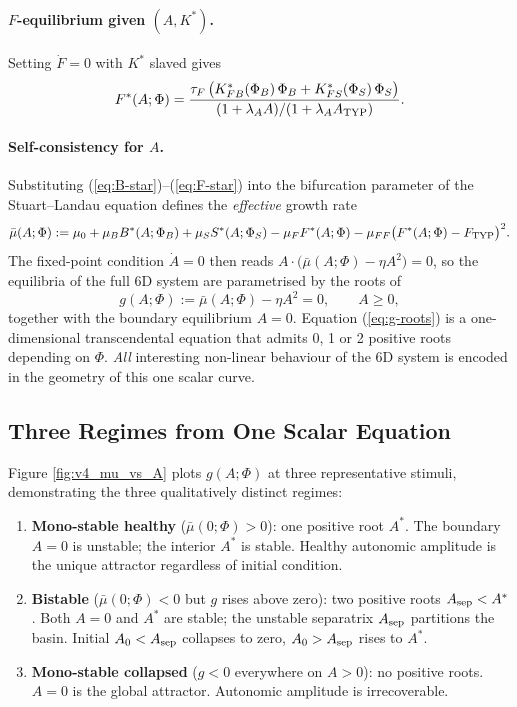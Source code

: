 \paragraph{$F$-equilibrium given $(A, K^*)$.}
Setting $\dot F = 0$ with $K^*$ slaved gives
\begin{equation}
F^*(A; \Phi) = \frac{\tau_F \, \big(K_{FB}^*(\Phi_B)\,\Phi_B + K_{FS}^*(\Phi_S)\,\Phi_S\big)}{(1 + \lambda_A A)/(1 + \lambda_A A_{\rm TYP})}.
\label{eq:F-star}
\end{equation}

\paragraph{Self-consistency for $A$.}
Substituting (\ref{eq:B-star})–(\ref{eq:F-star}) into the bifurcation parameter of the Stuart--Landau equation defines the \emph{effective} growth rate
\begin{equation}
\bar\mu(A; \Phi) := \mu_0 + \mu_B B^*(A; \Phi_B) + \mu_S S^*(A; \Phi_S) - \mu_F F^*(A; \Phi) - \mu_{FF}\big(F^*(A; \Phi) - F_{\rm TYP}\big)^2.
\label{eq:mu-bar}
\end{equation}
The fixed-point condition $\dot A = 0$ then reads $A \cdot \big(\bar\mu(A; \Phi) - \eta A^2\big) = 0$, so the equilibria of the full 6D system are parametrised by the roots of
\begin{equation}
g(A; \Phi) := \bar\mu(A; \Phi) - \eta A^2 = 0, \qquad A \ge 0,
\label{eq:g-roots}
\end{equation}
together with the boundary equilibrium $A = 0$. Equation (\ref{eq:g-roots}) is a one-dimensional transcendental equation that admits 0, 1 or 2 positive roots depending on $\Phi$. \emph{All} interesting non-linear behaviour of the 6D system is encoded in the geometry of this one scalar curve.

\subsection{Three Regimes from One Scalar Equation} \label{sec:v4-three-regimes}

Figure \ref{fig:v4_mu_vs_A} plots $g(A; \Phi)$ at three representative stimuli, demonstrating the three qualitatively distinct regimes:

\begin{enumerate}
  \item \textbf{Mono-stable healthy} ($\bar\mu(0; \Phi) > 0$): one positive root $A^*$. The boundary $A = 0$ is unstable; the interior $A^*$ is stable. Healthy autonomic amplitude is the unique attractor regardless of initial condition.
  \item \textbf{Bistable} ($\bar\mu(0; \Phi) < 0$ but $g$ rises above zero): two positive roots $A_{\rm sep} < A^*$. Both $A = 0$ and $A^*$ are stable; the unstable separatrix $A_{\rm sep}$ partitions the basin. Initial $A_0 < A_{\rm sep}$ collapses to zero, $A_0 > A_{\rm sep}$ rises to $A^*$.
  \item \textbf{Mono-stable collapsed} ($g < 0$ everywhere on $A > 0$): no positive roots. $A = 0$ is the global attractor. Autonomic amplitude is irrecoverable.
\end{enumerate}

